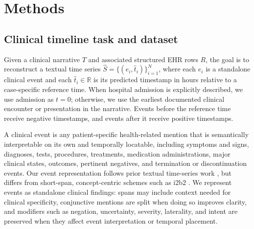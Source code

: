 \documentclass{ws-procs11x85}
\begin{document}
\section{Methods}
\label{sec:methods}
\vspace{-0.25em}

\subsection{Clinical timeline task and dataset}
\label{sec:data}
\vspace{-0.25em}

Given a clinical narrative $T$ and associated structured EHR rows $R$, the goal is to reconstruct a textual time series $\hat{S}=\{(e_i,\hat{t}_i)\}_{i=1}^{N}$, where each $e_i$ is a standalone clinical event and each $\hat{t}_i \in \mathbb{R}$ is its predicted timestamp in hours relative to a case-specific reference time. When hospital admission is explicitly described, we use admission as $t=0$; otherwise, we use the earliest documented clinical encounter or presentation in the narrative. Events before the reference time receive negative timestamps, and events after it receive positive timestamps.

A clinical event is any patient-specific health-related mention that is semantically interpretable on its own and temporally locatable, including symptoms and signs, diagnoses, tests, procedures, treatments, medication administrations, major clinical states, outcomes, pertinent negatives, and termination or discontinuation events. Our event representation follows prior textual time-series work \cite{wang2025large,noroozizadeh2026reconstructing,noroozizadeh2025pmoa,kumar2026temporally}, but differs from short-span, concept-centric schemes such as i2b2 \cite{uzuner20112010,sun2013evaluating}. We represent events as standalone clinical findings: spans may include context needed for clinical specificity, conjunctive mentions are split when doing so improves clarity, and modifiers such as negation, uncertainty, severity, laterality, and intent are preserved when they affect event interpretation or temporal placement.
\end{document}
